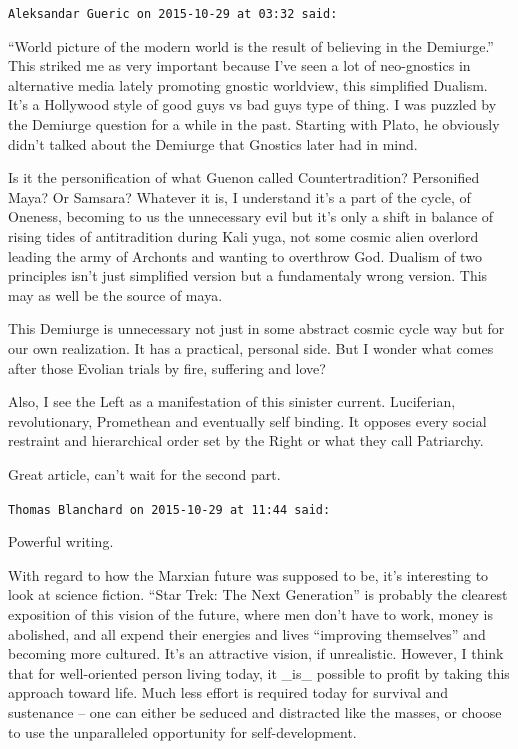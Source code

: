 \begin{footnotesize}
\begin{sffamily}
\texttt{Aleksandar Gueric on 2015-10-29 at 03:32 said:}

``World picture of the modern world is the result of believing in the Demiurge.'' This striked me as very important because I've seen a lot of neo-gnostics in alternative media lately promoting gnostic worldview, this simplified Dualism. It's a Hollywood style of good guys vs bad guys type of thing. I was puzzled by the Demiurge question for a while in the past. Starting with Plato, he obviously didn't talked about the Demiurge that Gnostics later had in mind.

Is it the personification of what Guenon called Countertradition? Personified Maya? Or Samsara? Whatever it is, I understand it's a part of the cycle, of Oneness, becoming to us the unnecessary evil but it's only a shift in balance of rising tides of antitradition during Kali yuga, not some cosmic alien overlord leading the army of Archonts and wanting to overthrow God. Dualism of two principles isn't just simplified version but a fundamentaly wrong version. This may as well be the source of maya.

This Demiurge is unnecessary not just in some abstract cosmic cycle way but for our own realization. It has a practical, personal side. But I wonder what comes after those Evolian trials by fire, suffering and love?

Also, I see the Left as a manifestation of this sinister current. Luciferian, revolutionary, Promethean and eventually self binding. It opposes every social restraint and hierarchical order set by the Right or what they call Patriarchy.

Great article, can't wait for the second part.

\hfill

\texttt{Thomas Blanchard on 2015-10-29 at 11:44 said:}

Powerful writing.

With regard to how the Marxian future was supposed to be, it's interesting to look at science fiction. ``Star Trek: The Next Generation'' is probably the clearest exposition of this vision of the future, where men don't have to work, money is abolished, and all expend their energies and lives ``improving themselves'' and becoming more cultured. It's an attractive vision, if unrealistic. However, I think that for well-oriented person living today, it \_is\_ possible to profit by taking this approach toward life. Much less effort is required today for survival and sustenance -- one can either be seduced and distracted like the masses, or choose to use the unparalleled opportunity for self-development.


\end{sffamily}
\end{footnotesize}
